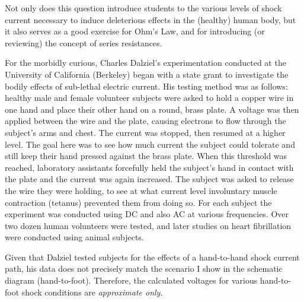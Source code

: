 
Not only does this question introduce students to the various levels of shock current necessary to induce deleterious effects in the (healthy) human body, but it also serves as a good exercise for Ohm's Law, and for introducing (or reviewing) the concept of series resistances.

For the morbidly curious, Charles Dalziel's experimentation conducted at the University of California (Berkeley) began with a state grant to investigate the bodily effects of sub-lethal electric current.  His testing method was as follows: healthy male and female volunteer subjects were asked to hold a copper wire in one hand and place their other hand on a round, brass plate.  A voltage was then applied between the wire and the plate, causing electrons to flow through the subject's arms and chest.  The current was stopped, then resumed at a higher level.  The goal here was to see how much current the subject could tolerate and still keep their hand pressed against the brass plate.  When this threshold was reached, laboratory assistants forcefully held the subject's hand in contact with the plate and the current was again increased.  The subject was asked to release the wire they were holding, to see at what current level involuntary muscle contraction (tetanus) prevented them from doing so.  For each subject the experiment was conducted using DC and also AC at various frequencies.  Over two dozen human volunteers were tested, and later studies on heart fibrillation were conducted using animal subjects. 

Given that Dalziel tested subjects for the effects of a hand-to-hand shock current path, his data does not precisely match the scenario I show in the schematic diagram (hand-to-foot).  Therefore, the calculated voltages for various hand-to-foot shock conditions are {\it approximate only}.




